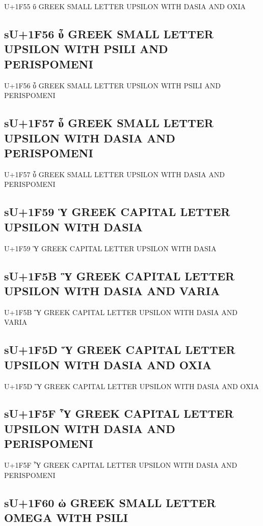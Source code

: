 U+1F55 ὕ GREEK SMALL LETTER UPSILON WITH DASIA AND OXIA

\subsection{sU+1F56 ὖ GREEK SMALL LETTER UPSILON WITH PSILI AND PERISPOMENI}

U+1F56 ὖ GREEK SMALL LETTER UPSILON WITH PSILI AND PERISPOMENI

\subsection{sU+1F57 ὗ GREEK SMALL LETTER UPSILON WITH DASIA AND PERISPOMENI}

U+1F57 ὗ GREEK SMALL LETTER UPSILON WITH DASIA AND PERISPOMENI

\subsection{sU+1F59 Ὑ GREEK CAPITAL LETTER UPSILON WITH DASIA}

U+1F59 Ὑ GREEK CAPITAL LETTER UPSILON WITH DASIA

\subsection{sU+1F5B Ὓ GREEK CAPITAL LETTER UPSILON WITH DASIA AND VARIA}

U+1F5B Ὓ GREEK CAPITAL LETTER UPSILON WITH DASIA AND VARIA

\subsection{sU+1F5D Ὕ GREEK CAPITAL LETTER UPSILON WITH DASIA AND OXIA}

U+1F5D Ὕ GREEK CAPITAL LETTER UPSILON WITH DASIA AND OXIA

\subsection{sU+1F5F Ὗ GREEK CAPITAL LETTER UPSILON WITH DASIA AND PERISPOMENI}

U+1F5F Ὗ GREEK CAPITAL LETTER UPSILON WITH DASIA AND PERISPOMENI

\subsection{sU+1F60 ὠ GREEK SMALL LETTER OMEGA WITH PSILI}

